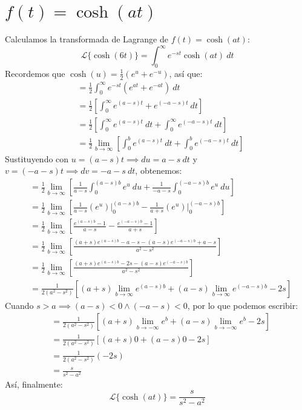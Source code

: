 \documentclass[12pt, a4paper]{article}
\begin{document}
\setcounter{section}{16}
\section{\texorpdfstring{\(f(t)=\cosh(at)\)}{f (t) = cosh (at)}}

Calculamos la transformada de Lagrange de \(f(t) = \cosh(at)\):
\[
	\mathcal{L}\{\cosh(6t)\} = \int_{0}^{\infty} e^{-st} \cosh(at) \ dt
\]
Recordemos que \(\cosh(u) = \frac{1}{2} \left( e^{u} + e^{-u} \right) \), así que:
\begin{align*}
	&= \frac{1}{2} \int_{0}^{\infty} e^{-st} \left( e^{at} + e^{-at} \right)  \ dt \\
	&= \frac{1}{2} \left[ \int_{0}^{\infty} e^{(a-s)t} + e^{(-a-s)t} \ dt \right] \\
	&= \frac{1}{2} \left[ \int_{0}^{\infty} e^{(a-s)t} \ dt + \int_{0}^{\infty} e^{(-a-s)t} \ dt \right] \\
	&= \frac{1}{2} \lim_{b \to \infty} \left[ \int_{0}^{b} e^{(a-s)t} \ dt + \int_{0}^{b} e^{(-a-s)t} \ dt \right]
\end{align*}
Sustituyendo con \(u = (a-s)t \implies du = a-s\ dt\) y \(v = (-a-s)t \implies dv = -a-s\ dt\), obtenemos:
\begin{align*}
	&= \frac{1}{2} \lim_{b \to \infty} \left[ \frac{1}{a-s} \int_{0}^{(a-s)b} e^{u} \ du + \frac{1}{-a-s} \int_{0}^{(-a-s)b} e^{u} \ du \right] \\
	&= \frac{1}{2} \lim_{b \to \infty} \left[ \frac{1}{a-s} \left. \left( e^{u} \right) \right|_{0}^{(a-s)b} - \frac{1}{a+s} \left. \left( e^{u} \right) \right|_{0}^{(-a-s)b} \right] \\
	&= \frac{1}{2} \lim_{b \to \infty} \left[ \frac{e^{(a-s)b} - 1}{a-s} - \frac{e^{(-a-s)b} - 1}{a+s} \right] \\
	&= \frac{1}{2} \lim_{b \to \infty} \left[ \frac{(a+s) e^{(a-s)b} - a - s - (a-s)e^{(-a-s)b} + a - s}{a^{2} - s ^{2}} \right] \\
	&= \frac{1}{2} \lim_{b \to \infty} \left[ \frac{(a+s) e^{(a-s)b} - 2s - (a-s)e^{(-a-s)b}}{a^{2}-s ^{2}} \right] \\
	&= \frac{1}{2(a^{2}-s ^{2})} \left[ (a+s) \lim_{b \to \infty} e^{(a-s)b} + (a-s) \lim_{b \to \infty} e^{(-a-s)b} - 2s \right]
\end{align*}
Cuando \(s > a \implies (a-s) < 0 \land (-a-s) < 0\), por lo que podemos escribir:
\begin{align*}
	&= \frac{1}{2(a^{2}-s ^{2})} \left[ (a+s) \lim_{b \to -\infty} e^{b} + (a-s) \lim_{b \to -\infty} e^{b} - 2s \right] \\
	&= \frac{1}{2(a^{2}-s ^{2})} \left[ (a+s) 0 + (a-s) 0 - 2s \right] \\
	&= \frac{1}{2(a^{2}-s ^{2})} (-2s) \\
	&= \frac{s}{s ^{2} - a^{2}}
\end{align*}
Así, finalmente:
\[
	\mathcal{L}\{\cosh(at)\} = \frac{s}{s ^{2} - a^{2}}
\]
\end{document}
